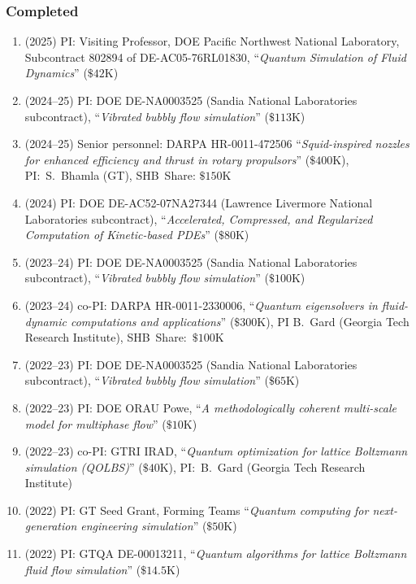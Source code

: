 \subsubsection{Completed}

\begin{enumerate}
    \item (2025) PI: Visiting Professor, DOE Pacific Northwest National Laboratory, Subcontract 802894 of DE-AC05-76RL01830, ``\textit{Quantum Simulation of Fluid Dynamics}'' ($\$42$K)
    \item (2024--25) PI: DOE DE-NA0003525 (Sandia National Laboratories subcontract), ``\textit{Vibrated bubbly flow simulation}'' ($\$113$K)
    \item (2024--25) Senior personnel: DARPA HR-0011-472506 ``\textit{Squid-inspired nozzles for enhanced  efficiency and thrust in rotary propulsors}'' ($\$400$K), PI:~S.~Bhamla (GT), SHB~Share: $\$150$K
    \item (2024) PI: DOE DE-AC52-07NA27344 (Lawrence Livermore National Laboratories subcontract), ``\textit{Accelerated, Compressed, and Regularized Computation of Kinetic-based PDEs}'' ($\$80$K)
    \item (2023--24) PI: DOE DE-NA0003525 (Sandia National Laboratories subcontract), ``\textit{Vibrated bubbly flow simulation}'' ($\$100$K)
    \item (2023--24) co-PI: DARPA HR-0011-2330006, ``\textit{Quantum eigensolvers in fluid-dynamic computations and applications}'' ($\$300$K), PI B.~Gard (Georgia Tech Research Institute), SHB~Share:~$\$100$K
    \item (2022--23) PI: DOE DE-NA0003525 (Sandia National Laboratories subcontract), ``\textit{Vibrated bubbly flow simulation}'' ($\$65$K)
    \item (2022--23) PI: DOE ORAU Powe, ``\textit{A methodologically coherent multi-scale model for multiphase flow}'' ($\$10$K)
    \item (2022--23) co-PI: GTRI IRAD, ``\textit{Quantum optimization for lattice Boltzmann simulation (QOLBS)}'' ($\$40$K), PI:~B.~Gard (Georgia Tech Research Institute)
    \item (2022) PI: GT Seed Grant, Forming Teams ``\textit{Quantum computing for next-generation engineering simulation}'' ($\$50$K)
    \item (2022) PI: GTQA DE-00013211, ``\textit{Quantum algorithms for lattice Boltzmann fluid flow simulation}'' ($\$14.5$K)
\end{enumerate}


